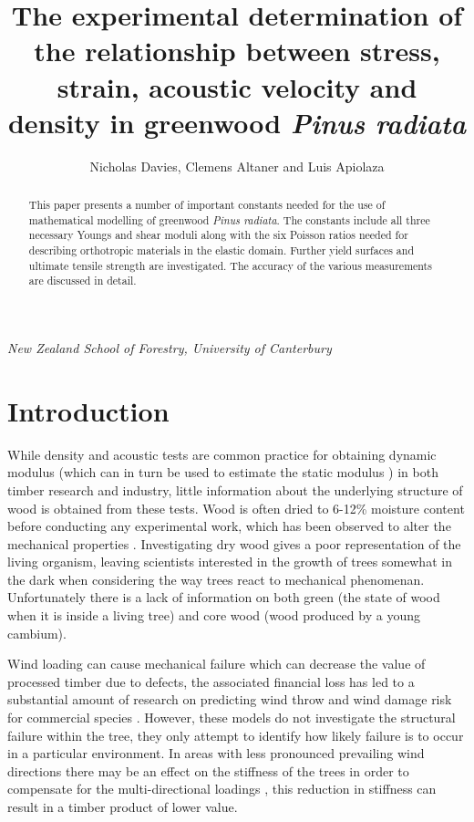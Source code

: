 \documentclass[10pt]{article}
\begin{document}
\begin{titlepage}
\title{The experimental determination of the relationship between stress, strain, acoustic velocity and density in greenwood \textit{Pinus radiata}}
\author{Nicholas Davies, Clemens Altaner and Luis Apiolaza}
\maketitle
\emph{New Zealand School of Forestry, University of Canterbury}
\begin{abstract}
This paper presents a number of important constants needed for the use of
 mathematical modelling of greenwood \textit{Pinus radiata}. The constants include all three necessary Youngs and shear moduli along with the six Poisson ratios needed for describing orthotropic materials in the elastic domain. Further yield surfaces and ultimate tensile strength are investigated. The accuracy of the various measurements are discussed in detail.
\end{abstract}

\thispagestyle{empty}
\end{titlepage}
\setcounter{page}{1}

\section{Introduction}
While density and acoustic tests are common practice for obtaining dynamic modulus (which can in turn be used to estimate the static modulus \citep{barker_properties_1998,lindstrom_stiffness_2004}) in both timber research and industry, little information about the underlying structure of wood is obtained from these tests. Wood is often dried to 6-12\% moisture content before conducting any experimental work, which has been observed to alter the mechanical properties \citep{skaar_springer_1988,ozyhar_moisture-dependent_2013}. Investigating dry wood gives a poor representation of the living organism, leaving scientists interested in the growth of trees somewhat in the dark when considering the way trees react to mechanical phenomenan. Unfortunately there is a lack of information on both green (the state of wood when it is inside a living tree) and core wood (wood produced by a young cambium).

Wind loading can cause mechanical failure which can decrease the value of processed timber due to defects, the associated financial loss has led to a substantial amount of research on predicting wind throw and wind damage risk for commercial species \citep{gardiner_review_2008}. However, these models do not investigate the structural failure within the tree, they only attempt to identify how likely failure is to occur in a particular environment. In areas with less pronounced prevailing wind directions there may be an effect on the stiffness of the trees in order to compensate for the multi-directional loadings \citep{apiolaza_characterization_2011,kern_mechanical_2005}, this reduction in stiffness can result in a timber product of lower value.
\end{document}
